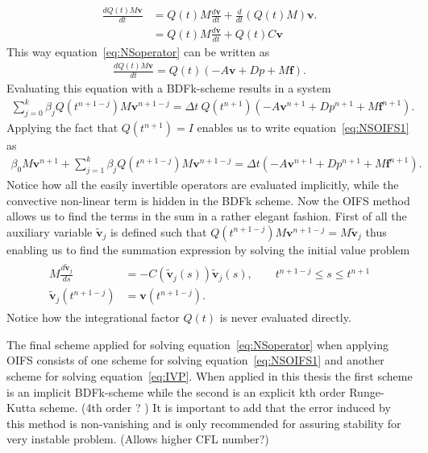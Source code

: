 \begin{align}
    \frac{dQ(t)M\mathbf{v}}{dt} &=  Q(t)M\frac{d\mathbf{v}}{dt} + \frac{d}{dt}(Q(t)M)\mathbf{v}.\\
    &= Q(t)M\frac{d\mathbf{v}}{dt} + Q(t)C\mathbf{v} 
    \label{eq:integrationalfactor}
\end{align}
%
This way equation~\ref{eq:NSoperator} can be written as 
\begin{align}
    \frac{d Q(t)M\mathbf{v}}{dt} =Q(t)( -A\mathbf{v} +D p +M\mathbf{f}).
    \label{eq:NSoperatorOIFS}
\end{align}
Evaluating this equation with a BDFk-scheme results in a system 
\begin{align}
    \sum_{j=0}^{k}\beta_jQ(t^{n+1-j})M\mathbf{v}^{n+1-j} =\Delta t \: Q(t^{n+1})( -A\mathbf{v}^{n+1} +D p^{n+1} +M\mathbf{f}^{n+1}).
    \label{eq:NSOIFS1}
\end{align}
Applying the fact that $Q(t^{n+1}) = I$ enables us to write equation~\ref{eq:NSOIFS1} as 
\begin{align}
    \beta_0M\mathbf{v}^{n+1} + \sum_{j=1}^{k}\beta_jQ(t^{n+1-j})M\mathbf{v}^{n+1-j} 
    =\Delta t ( -A\mathbf{v}^{n+1} +D p^{n+1} +M\mathbf{f}^{n+1}).
    \label{eq:NSOIFS1}
\end{align}
Notice how all the easily invertible operators are evaluated implicitly, while the convective non-linear term is hidden in the BDFk scheme. 
Now the OIFS method allows us to find the terms in the sum in a rather elegant fashion.  
First of all the auxiliary variable $\tilde{\mathbf{v}}_j$ is defined such that $Q(t^{n+1-j})M\mathbf{v}^{n+1-j} = M\tilde{\mathbf{v}}_j$ thus enabling us to find
the summation expression by solving the initial value problem 
\begin{align}
    \begin{split}
    M\frac{d\tilde{\mathbf{v}}_j}{ds} &= -C(\tilde{\mathbf{v}}_j(s))\tilde{\mathbf{v}}_j(s) , \qquad t^{n+1-j}\leq s\leq t^{n+1}\\
    \tilde{\mathbf{v}}_j(t^{n+1-j}) &= \mathbf{v}(t^{n+1-j}).
    \end{split}
    \label{eq:IVP}
\end{align}
Notice how the integrational factor $Q(t)$ is never evaluated directly.

The final scheme applied for solving equation~\ref{eq:NSoperator} when applying OIFS consists of one scheme for solving 
equation~\ref{eq:NSOIFS1} and another scheme for solving equation~\ref{eq:IVP}. When applied in this thesis the 
first scheme is an implicit BDFk-scheme while the second is an explicit kth order Runge-Kutta scheme. (4th order ? )
It is important to add that the error induced by this method is non-vanishing and is only recommended for assuring stability 
for very instable problem. (Allows higher CFL number?)

